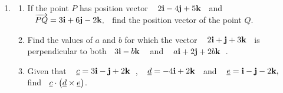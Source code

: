 \documentclass[11pt,a4paper]{article}
\begin{document}
\begin{enumerate}
\begin{enumerate}
    \item $\hspace{0.2cm} \underline{a}\times 3\underline{b}$
    
    \item $\hspace{0.2cm} \underline{a}\cdot \big(\underline{b}\times \underline{c}\big)$
    
    
    \item Find the area of the triangle $ABC$ whose vertices are $\hspace{0.2cm} A(2,-3,4),\hspace{0.3cm} B(0,1,2)\hspace{0.2cm}$ and $\hspace{0.2cm} C(-1,2,0)$\\
\end{enumerate}



\item 
\begin{enumerate}
      \item If the point $P$ has position vector $\hspace{0.3cm} 2\textbf{i} - 4\textbf{j} + 5\textbf{k}\hspace{0.2cm}$ and $\hspace{0.3cm} \overrightarrow{PQ} = 3\textbf{i} + 6\textbf{j} - 2\textbf{k},\hspace{0.2cm}$ find the position vector of the point $Q$.
      
      \item Find the values of $a$ and $b$ for which the vector $\hspace{0.3cm} 2\textbf{i} + \textbf{j} + 3\textbf{k}\hspace{0.2cm}$ is perpendicular to both $\hspace{0.2cm} 3\textbf{i}- b\textbf{k}\hspace{0.3cm}$ and $\hspace{0.3cm}  a\textbf{i} + 2 \textbf{j} + 2b\textbf{k}\hspace{0.2cm}$.
      
      \item Given that $\hspace{0.3cm} \underline{c} = 3\textbf{i} - \textbf{j} + 2\textbf{k}\hspace{0.2cm}$, $\hspace{0.3cm} \underline{d} = -4\textbf{i} + 2\textbf{k}\hspace{0.2cm}$ and $\hspace{0.3cm} \underline{e} = \textbf{i} - \textbf{j} - 2\textbf{k},\hspace{0.2cm}$ find $\hspace{0.2cm}\underline{c}\cdot\big( \underline{d}\times \underline{e}\big)$.
      

\end{enumerate}
\end{enumerate}
\end{document}

